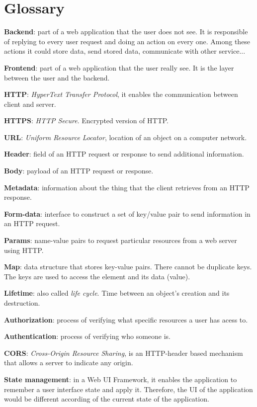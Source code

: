 \chapter{Glossary}

\textbf{Backend}: part of a web application that the user does not see. It is responsible of replying to every user request and doing an action on every one. Among these actions it could store data, send stored data, communicate with other service...
\bigskip

\textbf{Frontend}: part of a web application that the user really see. It is the layer between the user and the backend.
\bigskip

\textbf{HTTP}: \textit{HyperText Transfer Protocol}, it enables the communication between client and server. 
\bigskip

\textbf{HTTPS}: \textit{HTTP Secure}. Encrypted version of HTTP.
\bigskip

\textbf{URL}: \textit{Uniform Resource Locator}, location of an object on a computer network.
\bigskip

\textbf{Header}: field of an HTTP request or response to send additional information.
\bigskip

\textbf{Body}: payload of an HTTP request or response.
\bigskip

\textbf{Metadata}: information about the thing that the client retrieves from an HTTP response.
\bigskip

\textbf{Form-data}: interface to construct a set of key/value pair to send information in an HTTP request.
\bigskip

\textbf{Params}: name-value pairs to request particular resources from a web server using HTTP.
\bigskip

\textbf{Map}: data structure that stores key-value pairs. There cannot be duplicate keys. The keys are used to access the element and its data (value).
\bigskip

\textbf{Lifetime}: also called \textit{life cycle}. Time between an object's creation and its destruction.
\bigskip

\textbf{Authorization}: process of verifying what specific resources a user has acess to.
\bigskip

\textbf{Authentication}: process of verifying who someone is.
\bigskip

\textbf{CORS}: \textit{Cross-Origin Resource Sharing}, is an HTTP-header based mechanism that allows a server to indicate any origin.
\bigskip

\textbf{State management}: in a Web UI Framework, it enables the application to remember a user interface state and apply it. Therefore, the UI of the application would be different according of the current state of the application.
\bigskip

